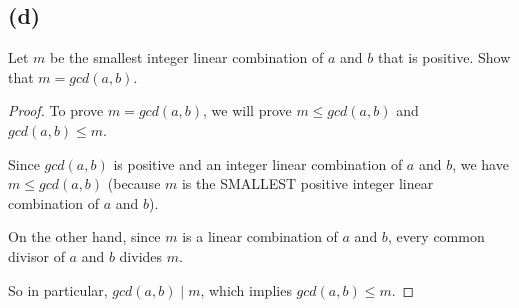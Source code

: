 \documentclass[14pt]{extarticle}
\begin{document}
\subsection{(d)}
Let $m$ be the smallest integer linear combination of $a$ and $b$ that is positive. Show that $m = gcd(a, b)$.
\begin{proof}
To prove $m = gcd(a, b)$, we will prove $m \leq gcd(a,b)$ and $gcd(a,b) \leq m$.

Since $gcd(a, b)$ is positive and an integer linear combination of $a$ and $b$, we have $m \leq gcd(a, b)$ (because $m$ is the SMALLEST positive integer linear combination of $a$ and $b$).

On the other hand, since $m$ is a linear combination of $a$ and $b$, every common divisor of $a$ and $b$ divides $m$. 

So in particular, $gcd(a, b) \mid m$, which implies $gcd(a, b) \leq m$.
\end{proof}
\end{document}
